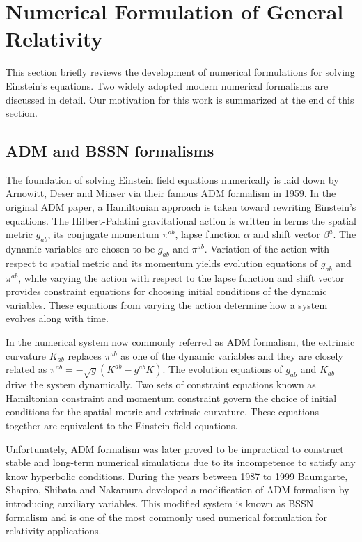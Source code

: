 \section{Numerical Formulation of General Relativity}\label{numericalformulation}
This section briefly reviews the development of numerical formulations for solving Einstein's equations. Two widely adopted modern numerical formalisms are discussed in detail. Our motivation for this work is summarized at the end of this section. 

\subsection{ADM and BSSN formalisms}
The foundation of solving Einstein field equations numerically is laid down by Arnowitt, Deser and Minser via their famous ADM formalism\cite{ADM:Witten} in 1959. In the original ADM paper, a Hamiltonian approach is taken toward rewriting Einstein's equations. The Hilbert-Palatini gravitational action is written in terms the spatial metric $g_{ab}$, its conjugate momentum $\pi^{ab}$, lapse function $\alpha$ and shift vector $\beta^{a}$. The dynamic variables are chosen to be $g_{ab}$ and $\pi^{ab}$. Variation of the action with respect to spatial metric and its momentum yields evolution equations of $g_{ab}$ and $\pi^{ab}$, while varying the action with respect to the lapse function and shift vector provides constraint equations for choosing initial conditions of the dynamic variables. These equations from varying the action determine how a system evolves along with time. 

In the numerical system now commonly referred as ADM formalism, the extrinsic curvature $K_{ab}$ replaces $\pi^{ab}$ as one of the dynamic variables and they are closely related as $\pi^{ab} = -\sqrt{g}(K^{ab} - g^{ab}K)$. The evolution equations of $g_{ab}$ and $K_{ab}$ drive the system dynamically. Two sets of constraint equations known as Hamiltonian constraint and momentum constraint govern the choice of initial conditions for the spatial metric and extrinsic curvature. These equations together are equivalent to the Einstein field equations. 

Unfortunately, ADM formalism was later proved to be impractical to construct stable and long-term numerical simulations due to its incompetence to satisfy any know hyperbolic conditions. During the years between 1987 to 1999 Baumgarte, Shapiro, Shibata and Nakamura\cite{Shibata:1995we, Baumgarte:1998te} developed a modification of ADM formalism by introducing auxiliary variables. This modified system is known as BSSN formalism and is one of the most commonly used numerical formulation for relativity applications. 

